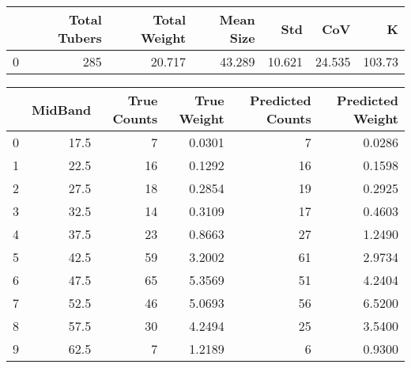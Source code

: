 \begin{tabular}{lrrrrrr}
\toprule
{} &  Total Tubers &  Total Weight &  Mean Size &     Std &     CoV &       K \\
\midrule
0 &           285 &        20.717 &     43.289 &  10.621 &  24.535 &  103.73 \\
\bottomrule
\end{tabular}

\begin{tabular}{lrrrrr}
\toprule
{} &  MidBand &  True Counts &  True Weight &  Predicted Counts &  Predicted Weight \\
\midrule
0 &     17.5 &            7 &       0.0301 &                 7 &            0.0286 \\
1 &     22.5 &           16 &       0.1292 &                16 &            0.1598 \\
2 &     27.5 &           18 &       0.2854 &                19 &            0.2925 \\
3 &     32.5 &           14 &       0.3109 &                17 &            0.4603 \\
4 &     37.5 &           23 &       0.8663 &                27 &            1.2490 \\
5 &     42.5 &           59 &       3.2002 &                61 &            2.9734 \\
6 &     47.5 &           65 &       5.3569 &                51 &            4.2404 \\
7 &     52.5 &           46 &       5.0693 &                56 &            6.5200 \\
8 &     57.5 &           30 &       4.2494 &                25 &            3.5400 \\
9 &     62.5 &            7 &       1.2189 &                 6 &            0.9300 \\
\bottomrule
\end{tabular}

